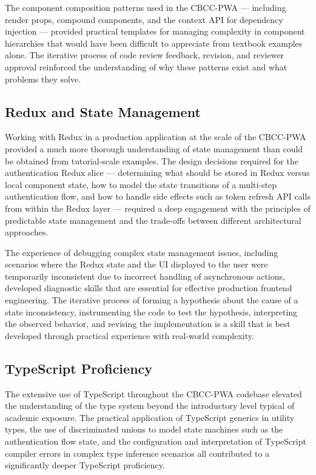 The component composition patterns used in the CBCC-PWA — including render props, compound components, and the context API for dependency injection — provided practical templates for managing complexity in component hierarchies that would have been difficult to appreciate from textbook examples alone. The iterative process of code review feedback, revision, and reviewer approval reinforced the understanding of why these patterns exist and what problems they solve.

\subsection{Redux and State Management}

Working with Redux in a production application at the scale of the CBCC-PWA provided a much more thorough understanding of state management than could be obtained from tutorial-scale examples. The design decisions required for the authentication Redux slice — determining what should be stored in Redux versus local component state, how to model the state transitions of a multi-step authentication flow, and how to handle side effects such as token refresh API calls from within the Redux layer — required a deep engagement with the principles of predictable state management and the trade-offs between different architectural approaches.

The experience of debugging complex state management issues, including scenarios where the Redux state and the UI displayed to the user were temporarily inconsistent due to incorrect handling of asynchronous actions, developed diagnostic skills that are essential for effective production frontend engineering. The iterative process of forming a hypothesis about the cause of a state inconsistency, instrumenting the code to test the hypothesis, interpreting the observed behavior, and revising the implementation is a skill that is best developed through practical experience with real-world complexity.

\subsection{TypeScript Proficiency}

The extensive use of TypeScript throughout the CBCC-PWA codebase elevated the understanding of the type system beyond the introductory level typical of academic exposure. The practical application of TypeScript generics in utility types, the use of discriminated unions to model state machines such as the authentication flow state, and the configuration and interpretation of TypeScript compiler errors in complex type inference scenarios all contributed to a significantly deeper TypeScript proficiency.

